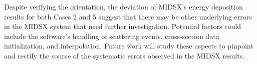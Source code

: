 \par Despite verifying the orientation, the deviation of MIDSX's energy deposition results for both Cases 2 and 5 suggest that there may be other underlying errors in the MIDSX system that need further investigation. Potential factors could include the software's handling of scattering events, cross-section data initialization, and interpolation. Future work will study these aspects to pinpoint and rectify the source of the systematic errors observed in the MIDSX results.



